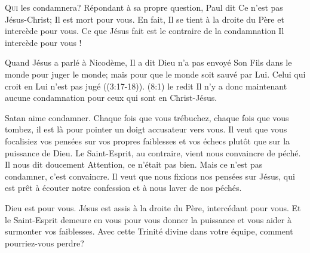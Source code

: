 


\lettrine[ante=\Og]{Q}{ui} les condamnera? \Fg{}
 Répondant à sa propre question, Paul dit\frcolon{} 
 \Og Ce n'est pas Jésus-Christ; Il est mort pour vous.
 En fait, Il se tient à la droite du Père et intercède pour vous. \Fg{}
 Ce que Jésus fait est le contraire de la condamnation
 \ocadr Il intercède pour vous !

Quand Jésus a parlé à Nicodème, Il a dit\frcolon{} 
 \Og Dieu n'a pas envoyé Son Fils dans le monde pour juger le monde;
 mais pour que le monde soit sauvé par Lui. Celui qui croit en Lui
 n'est pas jugé \Fg{} ((3:17-18)).
 (8:1) le redit\frcolon{} 
 \Og Il n'y a donc maintenant aucune condamnation
 pour ceux qui sont en Christ-Jésus. \Fg{}


Satan aime condamner. Chaque fois que vous trébuchez,
 chaque fois que vous tombez, il est là pour pointer un doigt accusateur
 vers vous. Il veut que vous focalisiez vos pensées sur vos propres faiblesses
 et vos échecs plutôt que sur la puissance de Dieu.
 Le Saint-Esprit, au contraire, vient nous convaincre de péché.
 Il nous dit doucement\frcolon{} 
 \Og Attention, ce n'était pas bien. \Fg{}
 Mais ce n'est pas condamner, c'est convaincre.
 Il veut que nous fixions nos pensées sur Jésus,
 qui est prêt à écouter notre confession et à nous laver de nos péchés.

Dieu est pour vous. Jésus est assis à la droite du Père,
 intercédant pour vous. Et le Saint-Esprit demeure en vous
 pour vous donner la puissance et vous aider à surmonter vos faiblesses.
 Avec cette Trinité divine dans 
 votre équipe, comment pourriez-vous perdre?

\dvrule



